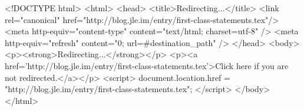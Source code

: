<!DOCTYPE html>
<html>
<head>
<title>Redirecting...</title>
<link rel="canonical" href="http://blog.jle.im/entry/first-class-statements.tex"/>
<meta http-equiv="content-type" content="text/html; charset=utf-8" />
<meta http-equiv="refresh" content="0; url=#{destination_path}" />
</head>
<body>
  <p><strong>Redirecting...</strong></p>
  <p><a href='http://blog.jle.im/entry/first-class-statements.tex'>Click here if you are not redirected.</a></p>
  <script>
    document.location.href = "http://blog.jle.im/entry/first-class-statements.tex";
  </script>
</body>
</html>
